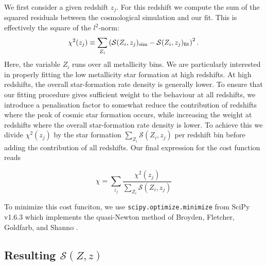 \documentclass[linenumbers,twocolumn]{aastex631}
\newcommand{\SFRDzZ}{\ensuremath{\mathcal{S}(Z,z)}\xspace}
\begin{document}
We first consider a given redshift $z_j$.  For this redshift we compute the sum of the squared residuals between the cosmological simulation and our fit. This is effectively the square of the $l^2$-norm:
%
\begin{equation}
\label{eq: chisquare}
    \chi^2 (z_j) \equiv \sum_{Z_i} \left( 
        \mathcal{S}(Z_i,z_j)_{\rm sim} - 
        \mathcal{S}(Z_i,z_j)_{\rm fit}\right)^2 .
\end{equation}
%
Here, the variable $Z_i$ runs over all metallicity bins.
We are particularly interested in properly fitting the low metallicity star formation at high redshifts. At high redshifts, the overall star-formation rate density is generally lower. To ensure that our fitting procedure gives sufficient weight to the behaviour at all redshifts, we introduce a penalisation factor to somewhat reduce the contribution of redshifts where the peak of cosmic star formation occurs, while increasing the weight at redshifts where the overall star-formation rate density is lower.  To achieve this we divide $\chi^2 (z_j)$ by the star formation $\sum_{Z_i} \mathcal{S}(Z_i,z_j)$ per redshift bin before adding the contribution of all redshifts.  Our final expression for the cost function reads

\begin{equation}
\label{eq: cost function}
    \chi  = \sum_{z_j} \frac{ \chi^2 (z_j) } 
        {\sum_{Z_i} \mathcal{S}(Z_i,z_j)}
\end{equation}

To minimize this cost funciton, we use \texttt{scipy.optimize.minimize} from SciPy v1.6.3 which implements the quasi-Newton method of Broyden, Fletcher, Goldfarb, and Shanno \citep[BFGS,][]{NocedalWright_numerical_optimization}. 

\subsection{Resulting \SFRDzZ}
\end{document}
